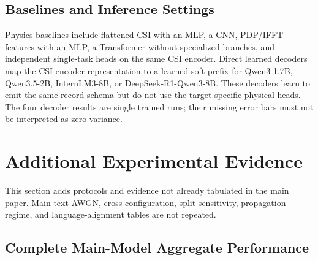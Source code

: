 \subsection{Baselines and Inference Settings}

Physics baselines include flattened CSI with an MLP, a CNN, PDP/IFFT features with an MLP, a
Transformer without specialized branches, and independent single-task heads on the same CSI
encoder. Direct learned decoders map the CSI encoder representation to a learned soft prefix for
Qwen3-1.7B, Qwen3.5-2B, InternLM3-8B, or DeepSeek-R1-Qwen3-8B. These decoders learn to emit
the same record schema but do not use the target-specific physical heads. The four decoder results are
single trained runs; their missing error bars must not be interpreted as zero variance.

\section{Additional Experimental Evidence}

This section adds protocols and evidence not already tabulated in the main paper. Main-text AWGN,
cross-configuration, split-sensitivity, propagation-regime, and language-alignment tables are not
repeated.

\subsection{Complete Main-Model Aggregate Performance}

